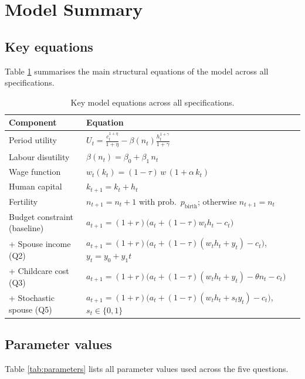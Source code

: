 \section{Model Summary}

\subsection{Key equations}

Table \ref{tab:model_formulation} summarises the main structural equations of the model across all specifications.

\begin{table}[H]
\centering
\renewcommand{\arraystretch}{1.6}
\begin{tabularx}{\textwidth}{lX}
\hline
\textbf{Component} & \textbf{Equation} \\
\hline
Period utility & $\displaystyle U_t = \frac{c_t^{1+\eta}}{1+\eta} - \beta(n_t)\frac{h_t^{1+\gamma}}{1+\gamma}$ \\
Labour disutility & $\beta(n_t) = \beta_0 + \beta_1\, n_t$ \\
Wage function & $w_t(k_t) = (1-\tau)\,w\,(1 + \alpha\, k_t)$ \\
Human capital & $k_{t+1} = k_t + h_t$ \\
Fertility & $n_{t+1} = n_t + 1$ with prob.\ $p_{\text{birth}}$; otherwise $n_{t+1} = n_t$ \\
\hline
Budget constraint (baseline) & $a_{t+1} = (1+r)\bigl(a_t + (1-\tau)w_t h_t - c_t\bigr)$ \\
\quad + Spouse income (Q2) & $a_{t+1} = (1+r)\bigl(a_t + (1-\tau)(w_t h_t + y_t) - c_t\bigr)$,\quad $y_t = y_0 + y_1 t$ \\
\quad + Childcare cost (Q3) & $a_{t+1} = (1+r)\bigl(a_t + (1-\tau)(w_t h_t + y_t) - \theta n_t - c_t\bigr)$ \\
\quad + Stochastic spouse (Q5) & $a_{t+1} = (1+r)\bigl(a_t + (1-\tau)(w_t h_t + s_t y_t) - c_t\bigr)$,\quad $s_t \in \{0,1\}$ \\
\hline
\end{tabularx}
\caption{Key model equations across all specifications.}
\label{tab:model_formulation}
\end{table}

\subsection{Parameter values}

Table \ref{tab:parameters} lists all parameter values used across the five questions.

